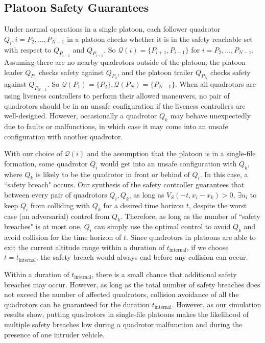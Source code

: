 \subsection{Platoon Safety Guarantees \label{subsec:safety_guarantees}}
Under normal operations in a single platoon, each follower quadrotor $Q_i,i=P_2,\ldots,P_{N-1}$ in a platoon checks whether it is in the safety reachable set with respect to $Q_{P_{i-1}}$ and $Q_{P_{i+1}}$. So $\mathcal{Q}(i) = \{P_{i+1}, P_{i-1}\}$ for $i=P_2,\ldots,P_{N-1}$. Assuming there are no nearby quadrotors outside of the platoon, the platoon leader $Q_{P_1}$ checks safety against $Q_{P_2}$, and the platoon trailer $Q_{P_N}$ checks safety against $Q_{P_{N-1}}$. So $\mathcal{Q}(P_1)=\{P_2\}, \mathcal{Q}(P_N)=\{P_{N-1}\}$. When all quadrotors are using liveness controllers to perform their allowed maneuvers, no pair of quadrotors should be in an unsafe configuration if the liveness controllers are well-designed. However, occasionally a quadrotor $Q_k$ may behave unexpectedly due to faults or malfunctions, in which case it may come into an unsafe configuration with another quadrotor.

With our choice of $\mathcal{Q}(i)$ and the assumption that the platoon is in a single-file formation, some quadrotor $Q_i$ would get into an unsafe configuration with $Q_k$, where $Q_k$ is likely to be the quadrotor in front or behind of $Q_i$. In this case, a ``safety breach" occurs. Our synthesis of the safety controller guarantees that between every pair of quadrotors $Q_i,Q_k$, as long as $V_S(-t,x_i- x_k)>0$, $\exists u_i$ to keep $Q_i$ from colliding with $Q_k$ for a desired time horizon $t$, despite the worst case (an adversarial) control from $Q_k$. Therefore, as long as the number of ``safety breaches" is at most one, $Q_i$ can simply use the optimal control to avoid $Q_k$ and avoid collision for the time horizon of $t$. Since quadrotors in platoons are able to exit the current altitude range within a duration of $t_\text{internal}$, if we choose $t=t_\text{internal}$, the safety breach would always end before any collision can occur. 

Within a duration of $t_\text{internal}$, there is a small chance that additional safety breaches may occur. However, as long as the total number of safety breaches does not exceed the number of affected quadrotors, collision avoidance of all the quadrotors can be guaranteed for the duration $t_\text{internal}$. However, as our simulation results show, putting quadrotors in single-file platoons makes the likelihood of multiple safety breaches low during a quadrotor malfunction and during the presence of one intruder vehicle. 


